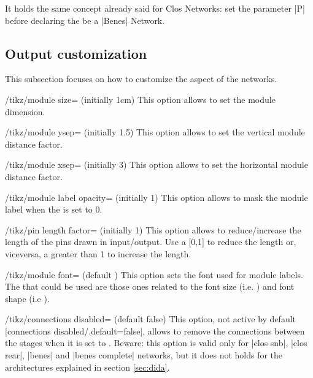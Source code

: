 \documentclass{ltxdoc}
\begin{document}
It holds the same concept already said for Clos Networks: set the parameter |P| before declaring the  be a |Benes| Network.


\subsection{Output customization}
\label{subsec:customization}
This subsection focuses on how to customize the aspect of the networks.

\begin{key}{/tikz/module size= (initially 1cm)}
    This option allows to set the module dimension.
\end{key}

\begin{key}{/tikz/module ysep= (initially 1.5)}
    This option allows to set the vertical module distance factor.
\end{key}

\begin{key}{/tikz/module xsep= (initially 3)}
    This option allows to set the horizontal module distance factor.
\end{key}

\begin{key}{/tikz/module label opacity= (initially 1)}
    This option allows to mask the module label when the  is set to 0.
\end{key}

\begin{key}{/tikz/pin length factor= (initially 1)}
    This option allows to reduce/increase the length of the pins drawn in input/output. Use a  [0,1] to reduce the length or, viceversa, a  greater than 1 to increase the length.
\end{key}

\begin{key}{/tikz/module font= (default )}
    This option sets the font used for module labels. The  that could be used are those ones related to the font size (i.e. ) and font shape (i.e ).
\end{key}

\begin{key}{/tikz/connections disabled= (default false)}
	This option, not active by default |connections disabled/.default=false|, allows to remove the connections between the stages when it is set to . Beware: this option is valid only for |clos snb|, |clos rear|, |benes| and |benes complete| networks, but it does not holds for the architectures explained in section \ref{sec:dida}.
\end{key}
\end{document}
